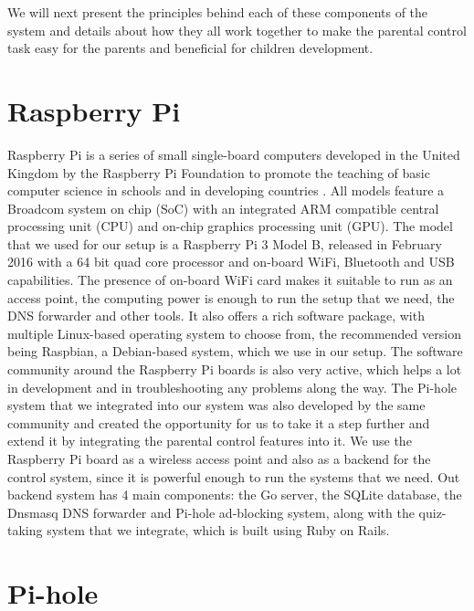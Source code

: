 We will next present the principles behind each of these components of the system and details about how they all work together to make the parental control task easy for the parents and beneficial for children development.

\section{Raspberry Pi}

Raspberry Pi is a series of small single-board computers developed in the United Kingdom by the Raspberry Pi Foundation to promote the teaching of basic computer science in schools and in developing countries \citep{cellan2011raspberryPi}. All models feature a Broadcom system on chip (SoC) with an integrated ARM compatible central processing unit (CPU) and on-chip graphics processing unit (GPU). The model that we used for our setup is a Raspberry Pi 3 Model B, released in February 2016 with a 64 bit quad core processor and on-board WiFi, Bluetooth and USB capabilities. The presence of on-board WiFi card makes it suitable to run as an access point, the computing power is enough to run the setup that we need, the DNS forwarder and other tools. It also offers a rich software package, with multiple Linux-based operating system to choose from, the recommended version being Raspbian, a Debian-based system, which we use in our setup. The software community around the Raspberry Pi boards is also very active, which helps a lot in development and in troubleshooting any problems along the way. The Pi-hole system that we integrated into our system was also developed by the same community and created the opportunity for us to take it a step further and extend it by integrating the parental control features into it. We use the Raspberry Pi board as a wireless access point and also as a backend for the control system, since it is powerful enough to run the systems that we need. Out backend system has 4 main components: the Go server, the SQLite database, the Dnsmasq DNS forwarder and Pi-hole ad-blocking system, along with the quiz-taking system that we integrate, which is built using Ruby on Rails.

\section{Pi-hole}

